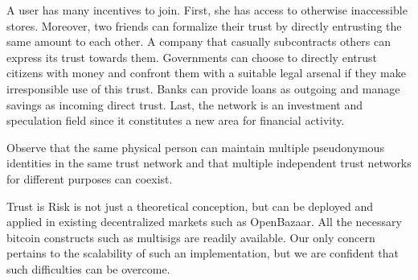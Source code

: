   A user has many incentives to join. First, she has access to otherwise inaccessible stores. Moreover, two friends can
  formalize their trust by directly entrusting the same amount to each other. A company that casually subcontracts others can
  express its trust towards them. Governments can choose to directly entrust citizens with money and confront them with a
  suitable legal arsenal if they make irresponsible use of this trust. Banks can provide loans as outgoing and manage
  savings as incoming direct trust. Last, the network is an investment and speculation field since it constitutes a new area
  for financial activity.

  Observe that the same physical person can maintain multiple pseudonymous identities in the same trust network and that
  multiple independent trust networks for different purposes can coexist.

  Trust is Risk is not just a theoretical conception, but can be deployed and applied in existing decentralized markets such
  as OpenBazaar. All the necessary bitcoin constructs such as multisigs are readily available. Our only concern pertains to
  the scalability of such an implementation, but we are confident that such difficulties can be overcome.
